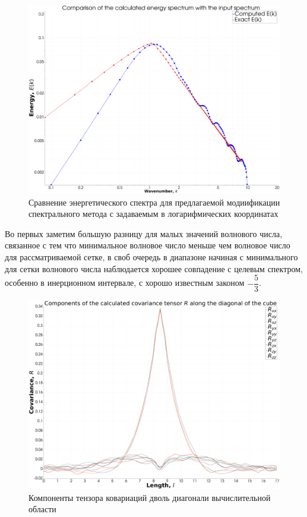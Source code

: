 \begin{figure}[ht] 
    \center
    \includegraphics [width=0.8\linewidth] {images/spectral/spectra_l10_k10_f1000_n51_loglog.png}
    \caption{Сравнение энергетического спектра для предлагаемой модиификации спектрального метода с задаваемым в логарифмических координатах} 
    \label{img:spectral_desam_spectra_comarison}  
\end{figure}

Во первых заметим большую разницу для малых значений волнового числа, связанное с тем что минимальное волновое число меньше чем волновое число для рассматриваемой сетке, в своб очередь в диапазоне начиная с минимального для сетки волнового числа наблюдается хорошее совпадение с целевым спектром, особенно в инерционном интервале, с хорошо известным законом $-\dfrac{5}{3}$.
  
\begin{figure}[ht] 
    \center
    \includegraphics [width=0.8\linewidth] {images/spectral/covariance_function_tensor.png}
    \caption{Компоненты тензора ковариаций дволь диагонали вычислительной области} 
    \label{img:spectral_desam_covariance_comarison}  
\end{figure}

